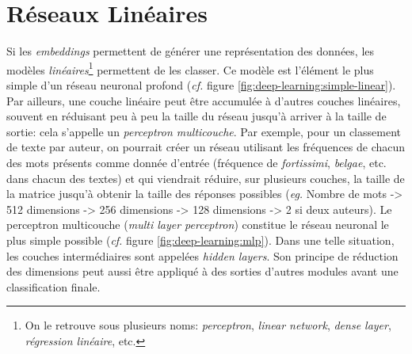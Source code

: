 \section{Réseaux Linéaires}
\label{deep-learning:linear}

Si les \textit{embeddings} permettent de générer une représentation des données, les modèles \textit{linéaires}\footnote{On le retrouve sous plusieurs noms: \textit{perceptron}, \textit{linear network}, \textit{dense layer}, \textit{régression linéaire}, etc.} permettent de les classer. Ce modèle est l'élément le plus simple d'un réseau neuronal profond (\textit{cf.} figure \ref{fig:deep-learning:simple-linear}). Par ailleurs, une couche linéaire peut être accumulée à d'autres couches linéaires, souvent en réduisant peu à peu la taille du réseau jusqu'à arriver à la taille de sortie: cela s'appelle un \textit{perceptron multicouche}. Par exemple, pour un classement de texte par auteur, on pourrait créer un réseau utilisant les fréquences de chacun des mots présents comme donnée d'entrée (fréquence de \textit{fortissimi}, \textit{belgae}, etc. dans chacun des textes) et qui viendrait réduire, sur plusieurs couches, la taille de la matrice jusqu'à obtenir la taille des réponses possibles (\textit{eg.} Nombre de mots -> 512 dimensions -> 256 dimensions -> 128 dimensions -> 2 si deux auteurs). Le perceptron multicouche (\textit{multi layer perceptron}) constitue le réseau neuronal le plus simple possible (\textit{cf.} figure \ref{fig:deep-learning:mlp}). Dans une telle situation, les couches intermédiaires sont appelées \textit{hidden layers}. Son principe de réduction des dimensions peut aussi être appliqué à des sorties d'autres modules avant une classification finale.

